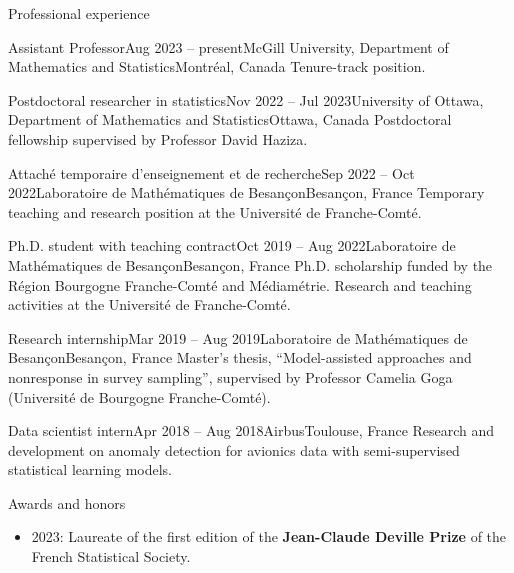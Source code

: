 \documentclass{resume}
\begin{document}
\begin{rSection}{Professional experience}
\vspace{2mm}

\begin{rSubsection}{Assistant Professor}{Aug 2023 -- present}{McGill University, Department of Mathematics and Statistics}{Montréal, Canada}
Tenure-track position.
\end{rSubsection}

\begin{rSubsection}{Postdoctoral researcher in statistics}{Nov 2022 -- Jul 2023}{University of Ottawa, Department of Mathematics and Statistics}{Ottawa, Canada}
Postdoctoral fellowship supervised by Professor David Haziza.
\end{rSubsection}

\begin{rSubsection}{Attaché temporaire d'enseignement et de recherche}{Sep 2022 -- Oct 2022}{Laboratoire de Mathématiques de Besançon}{Besançon, France}
Temporary teaching and research position at the Université de Franche-Comté.
\end{rSubsection}

\begin{rSubsection}{Ph.D. student with teaching contract}{Oct 2019 -- Aug 2022}{Laboratoire de Mathématiques de Besançon}{Besançon, France}
Ph.D. scholarship funded by the Région Bourgogne Franche-Comté and Médiamétrie. Research and teaching activities at the Université de Franche-Comté.
\end{rSubsection}

\begin{rSubsection}{Research internship}{Mar 2019 -- Aug 2019}{Laboratoire de Mathématiques de Besançon}{Besançon, France}
Master's thesis, ``Model-assisted approaches and nonresponse in survey sampling'', supervised by Professor Camelia Goga (Université de Bourgogne Franche-Comté).
\end{rSubsection}

\begin{rSubsection}{Data scientist intern}{Apr 2018 -- Aug 2018}{Airbus}{Toulouse, France}
Research and development on anomaly detection for avionics data with semi-supervised statistical learning models.
\end{rSubsection}
\end{rSection}

\begin{rSection}{Awards and honors}
\vspace{2mm}
\begin{itemize}
  \item[--] 2023: Laureate of the first edition of the \textbf{Jean-Claude Deville Prize} of the French Statistical Society.
\end{itemize}
\end{rSection}
\end{document}
